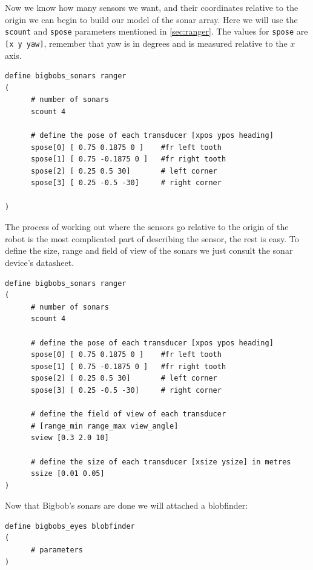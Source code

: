 \documentclass[a4paper]{report}
\begin{document}
Now we know how many sensors we want, and their coordinates relative to the origin we can begin to build our model of the sonar array. Here we will use the \verb|scount| and \verb|spose| parameters mentioned in \ref{sec:ranger}. The values for \verb|spose| are \verb|[x y yaw]|, remember that yaw is in degrees and is measured relative to the $x$ axis.
\begin{verbatim}
define bigbobs_sonars ranger
(
      # number of sonars
      scount 4

      # define the pose of each transducer [xpos ypos heading]
      spose[0] [ 0.75 0.1875 0 ]	#fr left tooth
      spose[1] [ 0.75 -0.1875 0 ]	#fr right tooth
      spose[2] [ 0.25 0.5 30]		# left corner
      spose[3] [ 0.25 -0.5 -30]		# right corner

)
\end{verbatim}

The process of working out where the sensors go relative to the origin of the robot is the most complicated part of describing the sensor, the rest is easy. To define the size, range and field of view of the sonars we just consult the sonar device's datasheet.
\begin{verbatim}
define bigbobs_sonars ranger
(
      # number of sonars
      scount 4

      # define the pose of each transducer [xpos ypos heading]
      spose[0] [ 0.75 0.1875 0 ]	#fr left tooth
      spose[1] [ 0.75 -0.1875 0 ]	#fr right tooth
      spose[2] [ 0.25 0.5 30]		# left corner
      spose[3] [ 0.25 -0.5 -30]		# right corner
      
      # define the field of view of each transducer 
      # [range_min range_max view_angle]
      sview [0.3 2.0 10]

      # define the size of each transducer [xsize ysize] in metres
      ssize [0.01 0.05]
)
\end{verbatim}

Now that Bigbob's sonars are done we will attached a blobfinder:
\begin{verbatim}
define bigbobs_eyes blobfinder
(
      # parameters
)
\end{verbatim}
\end{document}
